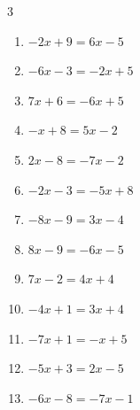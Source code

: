 \begin{multicols}{3}
\begin{enumerate}
        \phantom{$\displaystyle x=-4$}

  \item $-2x+9=6x-5$


  \item $-6x-3=-2x+5$

        \phantom{$\displaystyle x=-2$}

  \item $7x+6=-6x+5$


  \item $-x+8=5x-2$


\columnbreak %

\resetques

  \item $2x-8=-7x-2$


  \item $-2x-3=-5x+8$


  \item $-8x-9=3x-4$


  \item $8x-9=-6x-5$


  \item $7x-2=4x+4$

        \phantom{$\displaystyle x=2$}

  \item $-4x+1=3x+4$


  \item $-7x+1=-x+5$


  \item $-5x+3=2x-5$


  \item $-6x-8=-7x-1$

        \phantom{$\displaystyle x=7$}


\end{enumerate}
\end{multicols}
